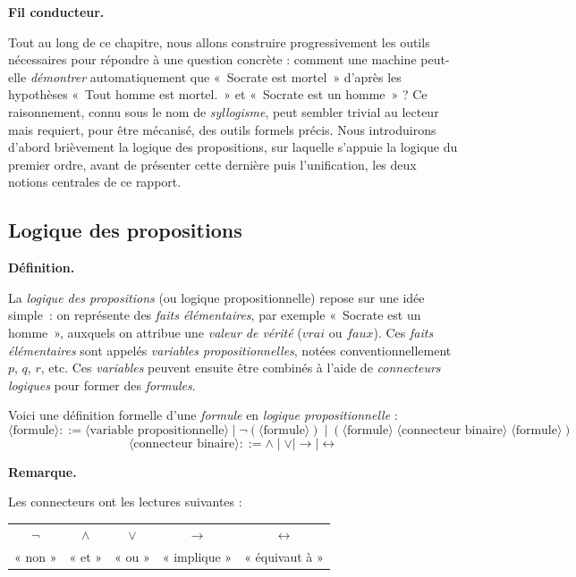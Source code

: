\documentclass[11pt]{article}
\newenvironment{paraph}[1]{%
  \medskip
  \noindent\textbf{#1.}\quad

  \vspace{0.2cm}
}{%
  \medskip
}
\newenvironment{remarque}{%
    \begin{mdframed}[
        linecolor=sectioncolor!40,
        linewidth=0.8pt,
        backgroundcolor=sectioncolor!5,
        innerleftmargin=10pt,
        innerrightmargin=10pt,
        innertopmargin=6pt,
        innerbottommargin=6pt,
        skipabove=8pt,
        skipbelow=8pt
    ]
    \noindent\textbf{\small\color{sectioncolor}Remarque.}\enspace\small\itshape
}{%
    \end{mdframed}
}
\begin{document}
\begin{paraph}{Fil conducteur}
Tout au long de ce chapitre, nous allons construire progressivement les outils nécessaires 
pour répondre à une question concrète : comment une machine peut-elle \emph{démontrer} 
automatiquement que «~Socrate est mortel~» d'après les hypothèses «~Tout homme est mortel.~» 
et «~Socrate est un homme~» ? Ce raisonnement, connu sous le nom de \textit{syllogisme}, 
peut sembler trivial au lecteur mais requiert,  pour être mécanisé, des outils formels précis. 
Nous introduirons d'abord brièvement la logique des propositions, sur laquelle s'appuie la 
logique du premier ordre, avant de présenter cette dernière puis l'unification, 
les deux notions centrales de ce rapport.
\end{paraph}
\subsection{Logique des propositions}
\begin{paraph}{Définition}
La \textit{logique des propositions} (ou logique propositionnelle) repose 
sur une idée simple~: on représente des \textit{faits élémentaires}, 
par exemple «~Socrate est un homme~», auxquels on attribue une 
\textit{valeur de vérité} ($vrai$ ou $faux$). Ces \textit{faits élémentaires} 
sont appelés \textit{variables propositionnelles}, notées 
conventionnellement $p$, $q$, $r$, etc. Ces \textit{variables} peuvent ensuite être combinés à 
l'aide de \textit{connecteurs logiques} pour former des \textit{formules}.
\end{paraph}

\vspace{0.2cm}
Voici une définition formelle d'une \textit{formule} en \textit{logique propositionnelle} :
\[
\langle\text{formule}\rangle ::= \langle\text{variable propositionnelle}\rangle \mid
\neg(\langle\text{formule}\rangle) \mid
(\langle\text{formule}\rangle\;\langle\text{connecteur binaire}\rangle\;\langle\text{formule}\rangle)
\]
\[
\langle\text{connecteur binaire}\rangle ::= \wedge \mid \vee \mid \rightarrow \mid \leftrightarrow
\]

\begin{remarque}
Les connecteurs ont les lectures suivantes :
\begin{center}
\begin{tabular}{ccccc}
    $\neg$ & $\wedge$ & $\vee$ & $\rightarrow$ & $\leftrightarrow$ \\
    « non » & « et » & « ou » & « implique » & « équivaut à »
\end{tabular}
\end{center}
\end{remarque}
\end{document}
